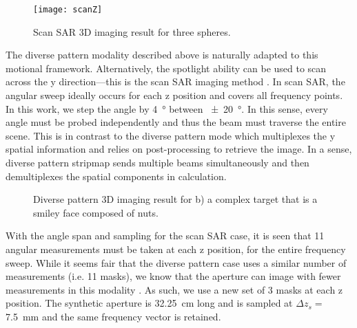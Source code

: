 \documentclass[journal]{IEEEtran}
\begin{document}
\begin{figure} 
	\centering
	\texttt{[image: scanZ]}
	\caption{\label{fig:f13}Scan SAR 3D imaging result for three spheres.}
\end{figure}

The diverse pattern modality described above is naturally adapted to this motional framework.   Alternatively, the spotlight ability can be used to scan across the y direction---this is the scan SAR imaging method \cite{scanSAR1981,scanSAR1996}. In scan SAR, the angular sweep ideally occurs for each z position and covers all frequency points. In this work, we step the angle by \SI{4}{\degree} between \SI{\pm 20}{\degree}. In this sense, every angle must be probed independently and thus the beam must traverse the entire scene. This is in contrast to the diverse pattern mode which multiplexes the y spatial information and relies on post-processing to retrieve the image. In a sense, diverse pattern stripmap sends multiple beams simultaneously and then demultiplexes the spatial components in calculation.

\begin{figure}
	\caption{\label{fig:f14}Diverse pattern 3D imaging result for b) a complex target that is a smiley face composed of nuts.}
\end{figure}

With the angle span and sampling for the scan SAR case, it is seen that 11 angular measurements must be taken at each z position, for the entire frequency sweep. While it seems fair that the diverse pattern case uses a similar number of measurements (i.e. 11 masks), we know that the aperture can image with fewer measurements in this modality \cite{sleasman2015DyAp1,sleasmanMarathon}. As such, we use a new set of 3 masks at each z position. The synthetic aperture is \SI{32.25}{\centi\meter} long and is sampled at $\Delta z_s =$ \SI{7.5}{\milli\meter} and the same frequency vector is retained.
\end{document}
